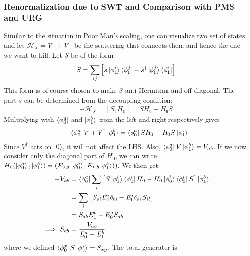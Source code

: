 \documentclass[twoside]{report}
\numberwithin{equation}{section}
\begin{document}
\subsubsection{Renormalization due to SWT and Comparison with PMS and URG}
Similar to the situation in Poor Man's scaling, one can visualize two set of states and let \(\mathcal{H}_X = V_+ + V_-\) be the scattering that connects them and hence the one we want to kill. Let \(S\) be of the form 
\begin{equation}\begin{aligned}
	S = \sum_{ij}\left[s\ket{\phi_1^i}\bra{\phi_0^j} - s^\dagger\ket{\phi_0^j}\bra{\phi_1^i}\right]
\end{aligned}\end{equation}
This form is of course chosen to make \(S\) anti-Hermitian and off-diagonal. The part \(s\) can be determined from the decoupling condition:
\begin{equation}\begin{aligned}
	-\mathcal{H}_X = \left[S, H_0\right] = S H_0 - H_0 S
\end{aligned}\end{equation}
Multiplying with \(\bra{\phi_0^a}\) and \(\ket{\phi_1^b}\) from the left and right respectively gives
\begin{equation}\begin{aligned}
-\bra{\phi_0^a}V + V^\dagger\ket{\phi_1^b} &= \bra{\phi_0^a}S H_0 - H_0 S\ket{\phi_1^b}\\
\end{aligned}\end{equation}
Since \(V^\dagger\) acts on \(\ket{0}\), it will not affect the LHS. Also, \(\bra{\phi_0^a}V\ket{\phi_1^b} = V_{ab}\). If we now consider only the diagonal part of \(H_0\), we can write \(H_0 (\ket{\phi_0^a},\ket{\phi_1^b}) = (E_{0,a}\ket{\phi_0^a},E_{1,b}\ket{\phi_1^b}))\). We then get
\begin{equation}\begin{aligned}
	-V_{ab} &= \bra{\phi_0^a}\sum_i\left[S\ket{\phi_1^i}\bra{\phi_1^i} H_0 - H_0 \ket{\phi_0^i}\bra{\phi_0^i}S\right]\ket{\phi_1^b}\\
		&= \sum_i\left[S_{ai}E_1^i \delta_{bi} - E^i_0 \delta_{ai}S_{ib}\right]\\
    &= S_{ab}E_1^b  - E^a_0 S_{ab}\\
\implies S_{ab} &= \frac{V_{ab}}{E_0^a - E_1^b}
\end{aligned}\end{equation}
where we defined \(\bra{\phi_0^x}S\ket{\phi_1^y} = S_{xy}\). The total generator is
\end{document}
